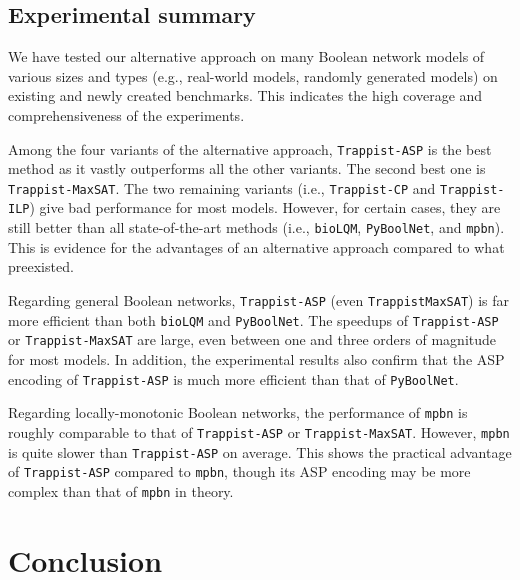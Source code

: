 \documentclass[preprint,12pt]{elsarticle}
\begin{document}

\subsection{Experimental summary}
\label{subsec:Experimental_summary}

We have tested our alternative approach on many Boolean network models of various sizes and types (e.g., real-world models, randomly generated models) on existing and newly created benchmarks.
This indicates the high coverage and comprehensiveness of the experiments.

Among the four variants of the alternative approach, \texttt{Trappist-ASP} is the best method as it vastly outperforms all the other variants.
The second best one is \texttt{Trappist-MaxSAT}.
The two remaining variants (i.e., \texttt{Trappist-CP} and \texttt{Trappist-ILP}) give bad performance for most models.
However, for certain cases, they are still better than all state-of-the-art methods (i.e., \texttt{bioLQM}, \texttt{PyBoolNet}, and \texttt{mpbn}).
This is evidence for the advantages of an alternative approach compared to what preexisted.

Regarding general Boolean networks, \texttt{Trappist-ASP} (even \texttt{Trappist\-MaxSAT}) is far more efficient than both \texttt{bioLQM} and \texttt{PyBoolNet}.
The speedups of \texttt{Trappist-ASP} or \texttt{Trappist-MaxSAT} are large, even between one and three orders of magnitude for most models.
In addition, the experimental results also confirm that the ASP encoding of \texttt{Trappist-ASP} is much more efficient than that of \texttt{PyBoolNet}.

Regarding locally-monotonic Boolean networks, the performance of \texttt{mpbn} is roughly comparable to that of \texttt{Trappist-ASP} or \texttt{Trappist-MaxSAT}.
However, \texttt{mpbn} is quite slower than \texttt{Trappist-ASP} on average.
This shows the practical advantage of \texttt{Trappist-ASP} compared to \texttt{mpbn}, though its ASP encoding may be more complex than that of \texttt{mpbn} in theory.


\section{Conclusion}%
\label{sec:Conclusion}
\end{document}
